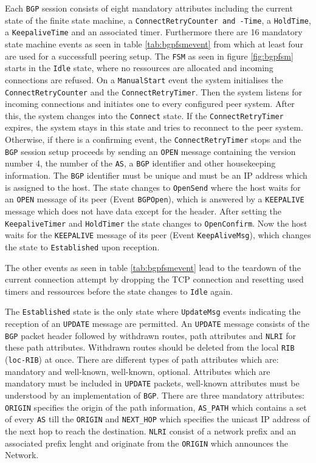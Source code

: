 \documentclass{acm_proc_article-sp}
\begin{document}
Each \texttt{BGP} session consists of eight mandatory attributes including the current state of the finite state machine, a \texttt{ConnectRetryCounter and -Time}, a \texttt{HoldTime}, a \texttt{KeepaliveTime} and an associated timer. Furthermore there are 16 mandatory state machine events as seen in table \ref{tab:bgpfsmevent} from which at least four are used for a successfull peering setup. The \texttt{FSM} as seen in figure \ref{fig:bgpfsm} starts in the \texttt{Idle} state, where no ressources are allocated and incoming connections are refused. On a \texttt{ManualStart} event the system initialises the \texttt{ConnectRetryCounter} and the \texttt{ConnectRetryTimer}. Then the system listens for incoming connections and initiates one to every configured peer system. After this, the system changes into the \texttt{Connect} state. If the \texttt{ConnectRetryTimer} expires, the system stays in this state and tries to reconnect to the peer system. Otherwise, if there is a confirming event, the \texttt{ConnectRetryTimer} stops and the \texttt{BGP} session setup proceeds by sending an \texttt{OPEN} message containing the version number 4, the number of the \texttt{AS}, a \texttt{BGP} identifier and other housekeeping information. The \texttt{BGP} identifier must be unique and must be an IP address which is assigned to the host. The state changes to \texttt{OpenSend} where the host waits for an \texttt{OPEN} message of its peer (Event \texttt{BGPOpen}), which is answered by a \texttt{KEEPALIVE} message which does not have data except for the header. After setting the \texttt{KeepaliveTimer} and \texttt{HoldTimer} the state changes to \texttt{OpenConfirm}. Now the host waits for the \texttt{KEEPALIVE} message of its peer (Event \texttt{KeepAliveMsg}), which changes the state to \texttt{Established} upon reception.

The other events as seen in table \ref{tab:bgpfsmevent} lead to the teardown of the current connection attempt by dropping the TCP connection and resetting used timers and ressources before the state changes to \texttt{Idle} again.

The \texttt{Established} state is the only state where \texttt{UpdateMsg} events indicating the reception of an \texttt{UPDATE} message are permitted. An \texttt{UPDATE} message consists of the \texttt{BGP} packet header followed by withdrawn routes, path attributes and \texttt{NLRI} for these path attributes. Withdrawn routes should be deleted from the local \texttt{RIB} (\texttt{loc-RIB}) at once. There are different types of path attributes which are: mandatory and well-known, well-known, optional. Attributes which are mandatory must be included in \texttt{UPDATE} packets, well-known attributes must be understood by an implementation of \texttt{BGP}. There are three mandatory attributes: \texttt{ORIGIN} specifies the origin of the path information, \texttt{AS\_PATH} which contains a set of every \texttt{AS} till the \texttt{ORIGIN} and \texttt{NEXT\_HOP} which specifies the unicast IP address of the next hop to reach the destination. \texttt{NLRI} consist of a network prefix and an associated prefix lenght and originate from the \texttt{ORIGIN} which announces the Network.
\end{document}
